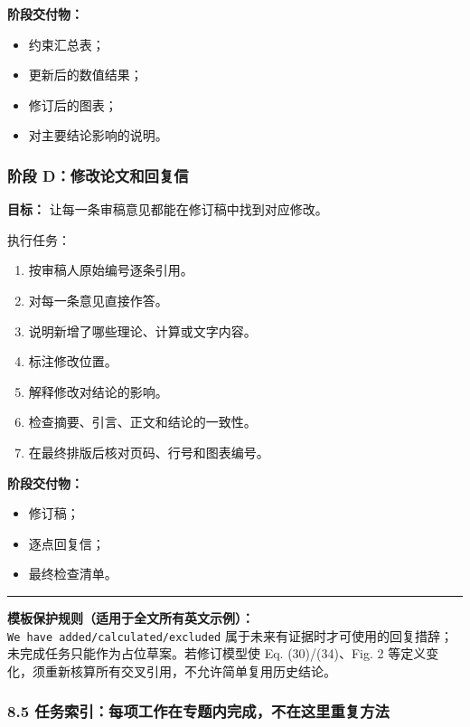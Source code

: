 \documentclass[
  chinese,
  UTF8]{ctexart}
\providecommand{\tightlist}{%
  \setlength{\itemsep}{0pt}\setlength{\parskip}{0pt}}
\begin{document}
\textbf{阶段交付物：}

\begin{itemize}
\tightlist
\item
  约束汇总表；
\item
  更新后的数值结果；
\item
  修订后的图表；
\item
  对主要结论影响的说明。
\end{itemize}

\subsubsection{阶段
D：修改论文和回复信}\label{ux9636ux6bb5-dux4feeux6539ux8bbaux6587ux548cux56deux590dux4fe1}

\textbf{目标：} 让每一条审稿意见都能在修订稿中找到对应修改。

执行任务：

\begin{enumerate}
\def\labelenumi{\arabic{enumi}.}
\tightlist
\item
  按审稿人原始编号逐条引用。
\item
  对每一条意见直接作答。
\item
  说明新增了哪些理论、计算或文字内容。
\item
  标注修改位置。
\item
  解释修改对结论的影响。
\item
  检查摘要、引言、正文和结论的一致性。
\item
  在最终排版后核对页码、行号和图表编号。
\end{enumerate}

\textbf{阶段交付物：}

\begin{itemize}
\tightlist
\item
  修订稿；
\item
  逐点回复信；
\item
  最终检查清单。
\end{itemize}

\begin{center}\rule{0.5\linewidth}{0.5pt}\end{center}

\textbf{模板保护规则（适用于全文所有英文示例）：}
\texttt{We\ have\ added/calculated/excluded}
属于未来有证据时才可使用的回复措辞；未完成任务只能作为占位草案。若修订模型使
Eq. (30)/(34)、Fig. 2
等定义变化，须重新核算所有交叉引用，不允许简单复用历史结论。

\subsubsection{8.5
任务索引：每项工作在专题内完成，不在这里重复方法}\label{ux4efbux52a1ux7d22ux5f15ux6bcfux9879ux5de5ux4f5cux5728ux4e13ux9898ux5185ux5b8cux6210ux4e0dux5728ux8fd9ux91ccux91cdux590dux65b9ux6cd5}
\end{document}
